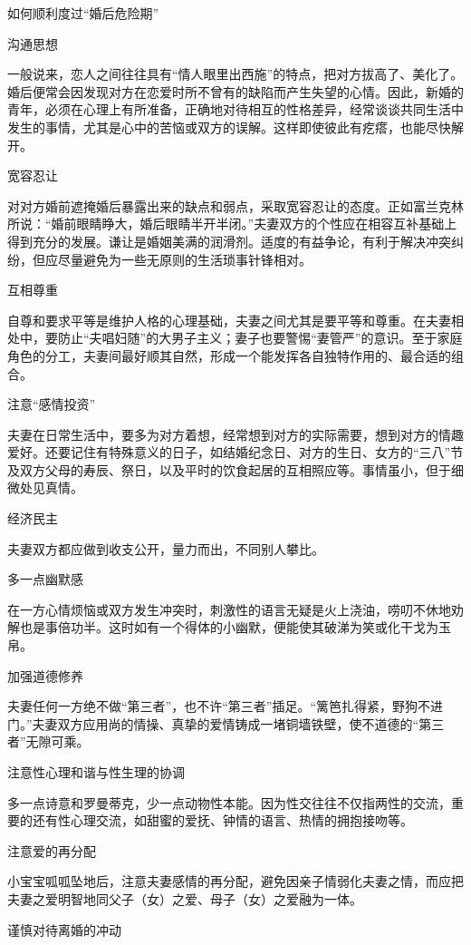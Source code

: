 \documentclass[12pt,UTF8,openany]{ctexbook}
\begin{document}
如何顺利度过“婚后危险期”


沟通思想

一般说来，恋人之间往往具有“情人眼里出西施”的特点，把对方拔高了、美化了。婚后便常会因发现对方在恋爱时所不曾有的缺陷而产生失望的心情。因此，新婚的青年，必须在心理上有所准备，正确地对待相互的性格差异，经常谈谈共同生活中发生的事情，尤其是心中的苦恼或双方的误解。这样即使彼此有疙瘩，也能尽快解开。

宽容忍让

对对方婚前遮掩婚后暴露出来的缺点和弱点，采取宽容忍让的态度。正如富兰克林所说：“婚前眼睛睁大，婚后眼睛半开半闭。”夫妻双方的个性应在相容互补基础上得到充分的发展。谦让是婚姻美满的润滑剂。适度的有益争论，有利于解决冲突纠纷，但应尽量避免为一些无原则的生活琐事针锋相对。

互相尊重

自尊和要求平等是维护人格的心理基础，夫妻之间尤其是要平等和尊重。在夫妻相处中，要防止“夫唱妇随”的大男子主义；妻子也要警惕“妻管严”的意识。至于家庭角色的分工，夫妻间最好顺其自然，形成一个能发挥各自独特作用的、最合适的组合。

注意“感情投资”

夫妻在日常生活中，要多为对方着想，经常想到对方的实际需要，想到对方的情趣爱好。还要记住有特殊意义的日子，如结婚纪念日、对方的生日、女方的“三八”节及双方父母的寿辰、祭日，以及平时的饮食起居的互相照应等。事情虽小，但于细微处见真情。

经济民主

夫妻双方都应做到收支公开，量力而出，不同别人攀比。

多一点幽默感

在一方心情烦恼或双方发生冲突时，刺激性的语言无疑是火上浇油，唠叨不休地劝解也是事倍功半。这时如有一个得体的小幽默，便能使其破涕为笑或化干戈为玉帛。

加强道德修养

夫妻任何一方绝不做“第三者”，也不许“第三者”插足。“篱笆扎得紧，野狗不进门。”夫妻双方应用尚的情操、真挚的爱情铸成一堵铜墙铁壁，使不道德的“第三者”无隙可乘。

注意性心理和谐与性生理的协调

多一点诗意和罗曼蒂克，少一点动物性本能。因为性交往往不仅指两性的交流，重要的还有性心理交流，如甜蜜的爱抚、钟情的语言、热情的拥抱接吻等。

注意爱的再分配

小宝宝呱呱坠地后，注意夫妻感情的再分配，避免因亲子情弱化夫妻之情，而应把夫妻之爱明智地同父子（女）之爱、母子（女）之爱融为一体。

谨慎对待离婚的冲动
\end{document}
